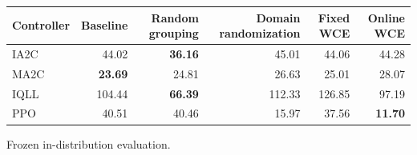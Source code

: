 \begin{tabular}{lrrrrr}
\hline
Controller & Baseline & Random grouping & Domain randomization & Fixed WCE & Online WCE \\
\hline
IA2C & 44.02 & \textbf{36.16} & 45.01 & 44.06 & 44.28 \\
MA2C & \textbf{23.69} & 24.81 & 26.63 & 25.01 & 28.07 \\
IQLL & 104.44 & \textbf{66.39} & 112.33 & 126.85 & 97.19 \\
PPO & 40.51 & 40.46 & 15.97 & 37.56 & \textbf{11.70} \\
\hline
\end{tabular}
Frozen in-distribution evaluation.
